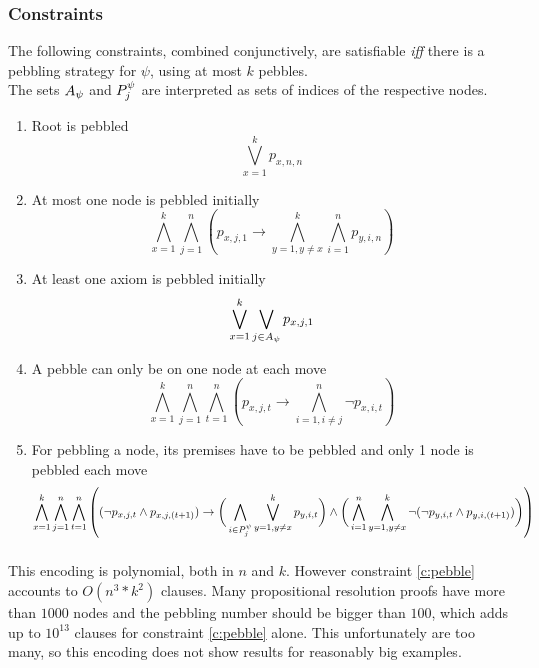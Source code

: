 \documentclass{llncs}
\begin{document}
\subsubsection*{Constraints}
The following constraints, combined conjunctively, are satisfiable \textit{iff} there is a pebbling strategy for $\psi$, using at most $k$ pebbles.\\
The sets $A_{\psi}$ and $P_{j}^{\psi}$ are interpreted as sets of indices of the respective nodes.

\begin{enumerate}
	\item Root is pebbled
				$$\bigvee_{x = 1}^k p_{x,n,n}$$
				
	\item At most one node is pebbled initially\\
				$$\bigwedge_{x = 1}^k \bigwedge_{j = 1}^n \left( p_{x,j,1} \rightarrow \bigwedge_{y = 1, y \neq x}^k \bigwedge_{i = 1}^n p_{y,i,n} \right)$$
	
	\item At least one axiom is pebbled initially\\
				$$\bigvee_{x = 1}^k \bigvee_{j \in A_{\psi}} p_{x,j,1}$$
				
	\item A pebble can only be on one node at each move
				$$\bigwedge_{x = 1}^k \bigwedge_{j = 1}^n \bigwedge_{t = 1}^n \left( p_{x,j,t} \rightarrow \bigwedge_{i = 1, i \neq j}^n \neg p_{x,i,t} \right)$$ 
				
	\item \label{c:pebble} For pebbling a node, its premises have to be pebbled and only 1 node is pebbled each move\\
				$$\bigwedge_{x = 1}^k \bigwedge_{j = 1}^n \bigwedge_{t = 1}^n \left( (\neg p_{x,j,t} \wedge p_{x,j,(t+1)} ) \rightarrow 
					\bigg( \bigwedge_{i \in P_{j}^{\psi}} \bigvee_{y = 1, y \neq x}^k p_{y,i,t} \bigg) \wedge 
					\bigg( \bigwedge_{i = 1}^n \bigwedge_{y = 1, y \neq x}^k \neg ( \neg p_{y,i,t} \wedge p_{y,i,(t+1)} ) \bigg) \right)$$
				
\end{enumerate}
\subsubsection*{}
This encoding is polynomial, both in $n$ and $k$. However constraint \ref{c:pebble} accounts to $O(n^3*k^2)$ clauses. Many propositional resolution proofs have more than $1000$ nodes and the pebbling number should be bigger than $100$, which adds up to $10^{13}$ clauses for constraint \ref{c:pebble} alone. This unfortunately are too many, so this encoding does not show results for reasonably big examples.
\end{document}
